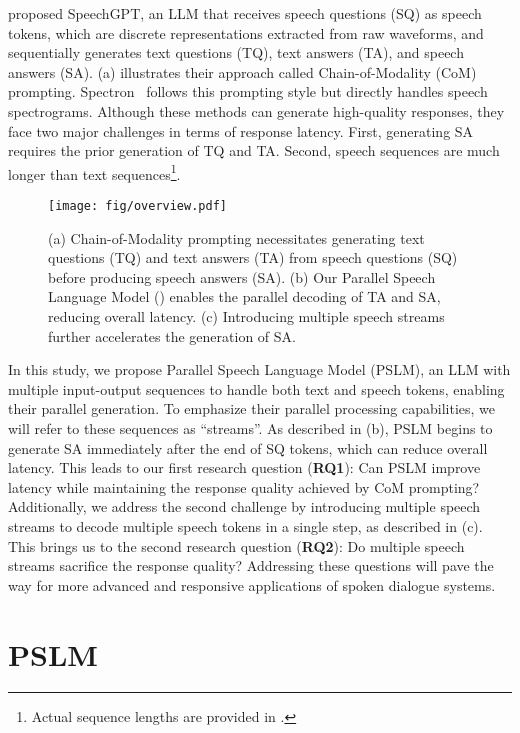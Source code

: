 \citet{zhang-etal-2023-speechgpt} proposed SpeechGPT, an LLM that receives speech questions (SQ) as speech tokens, which are discrete representations extracted from raw waveforms, and sequentially generates text questions (TQ), text answers (TA), and speech answers (SA).
 (a) illustrates their approach called Chain-of-Modality (CoM) prompting.
Spectron~\citep{nachmani2024spoken} follows this prompting style but directly handles speech spectrograms.
Although these methods can generate high-quality responses, they face two major challenges in terms of response latency.
First, generating SA requires the prior generation of TQ and TA.
Second, speech sequences are much longer than text sequences\footnote{Actual sequence lengths are provided in .}.

\begin{figure}[t]
  \texttt{[image: fig/overview.pdf]}
  \vspace{-10pt}
  \caption{(a) Chain-of-Modality prompting necessitates generating text questions (TQ) and text answers (TA) from speech questions (SQ) before producing speech answers (SA). (b) Our Parallel Speech Language Model (\prop) enables the parallel decoding of TA and SA, reducing overall latency. (c) Introducing multiple speech streams further accelerates the generation of SA.}
  \label{fig:overview}
  \vspace{-10pt}
\end{figure}

In this study, we propose Parallel Speech Language Model (PSLM), an LLM with multiple input-output sequences to handle both text and speech tokens, enabling their parallel generation.
To emphasize their parallel processing capabilities, we will refer to these sequences as ``streams''.
As described in  (b), PSLM begins to generate SA immediately after the end of SQ tokens, which can reduce overall latency.
This leads to our first research question (\textbf{RQ1}): Can PSLM improve latency while maintaining the response quality achieved by CoM prompting?
Additionally, we address the second challenge by introducing multiple speech streams to decode multiple speech tokens in a single step, as described in  (c).
This brings us to the second research question (\textbf{RQ2}): Do multiple speech streams sacrifice the response quality?
Addressing these questions will pave the way for more advanced and responsive applications of spoken dialogue systems.

\section{PSLM}

